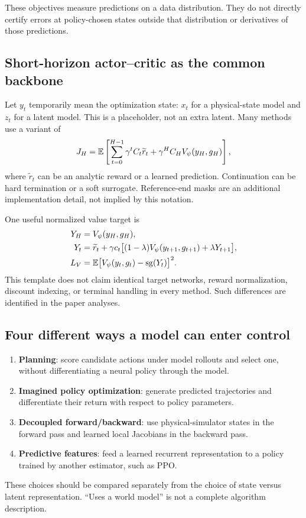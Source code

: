 These objectives measure predictions on a data distribution. They do not
directly certify errors at policy-chosen states outside that distribution or
derivatives of those predictions.

\subsection{Short-horizon actor--critic as the common backbone}
Let $y_t$ temporarily mean the optimization state: $x_t$ for a physical-state
model and $z_t$ for a latent model. This is a placeholder, not an extra latent.
Many methods use a variant of
\begin{equation}\label{eq:shortobjective}
J_H=\mathbb E\left[\sum_{t=0}^{H-1}\gamma^t C_t\widetilde r_t
+\gamma^H C_HV_\psi(y_H,g_H)\right],
\end{equation}
where $\widetilde r_t$ can be an analytic reward or a learned prediction.
Continuation can be hard termination or a soft surrogate. Reference-end masks
are an additional implementation detail, not implied by this notation.

One useful normalized value target is
\begin{align}\label{eq:lambda}
Y_H&=V_\psi(y_H,g_H),\\
Y_t&=\widetilde r_t+\gamma c_t\big[(1-\lambda)V_\psi(y_{t+1},g_{t+1})+\lambda Y_{t+1}\big],\\
L_V&=\mathbb E\big[V_\psi(y_t,g_t)-\operatorname{sg}(Y_t)\big]^2.
\end{align}
This template does not claim identical target networks, reward normalization,
discount indexing, or terminal handling in every method. Such differences are
identified in the paper analyses.

\subsection{Four different ways a model can enter control}
\begin{enumerate}
\item \textbf{Planning}: score candidate actions under model rollouts and select
one, without differentiating a neural policy through the model.
\item \textbf{Imagined policy optimization}: generate predicted trajectories and
differentiate their return with respect to policy parameters.
\item \textbf{Decoupled forward/backward}: use physical-simulator states in the
forward pass and learned local Jacobians in the backward pass.
\item \textbf{Predictive features}: feed a learned recurrent representation to
a policy trained by another estimator, such as PPO.
\end{enumerate}
These choices should be compared separately from the choice of state versus
latent representation. ``Uses a world model'' is not a complete algorithm description.


